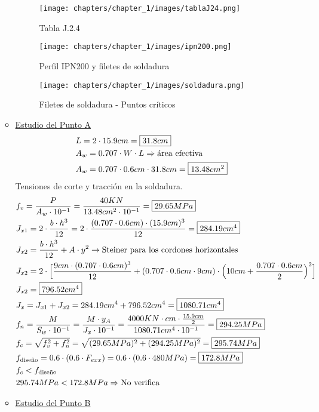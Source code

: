 \begin{enumerate}
\begin{itemize}
\begin{figure}[H]
\begin{center}
     \texttt{[image: chapters/chapter\_1/images/tablaJ24.png]}
\end{center}
\caption{Tabla J.2.4}
\end{figure}
\begin{figure}[H]
\begin{center}
     \texttt{[image: chapters/chapter\_1/images/ipn200.png]}
\end{center}
\caption{Perfil IPN200 y filetes de soldadura}
\end{figure}
\begin{figure}[H]
\begin{center}
     \texttt{[image: chapters/chapter\_1/images/soldadura.png]}
\end{center}
\caption{Filetes de soldadura - Puntos críticos}
\end{figure}

\item \underline{Estudio del Punto A}
\begin{align*}
& L = 2 \cdot 15.9cm = \framebox{$31.8cm$} \\
& A_w = 0.707 \cdot W \cdot L \Rightarrow \text{área efectiva} \\
& A_w = 0.707 \cdot 0.6 cm \cdot 31.8cm = \framebox{$13.48 cm^2$} \\
\end{align*}
Tensiones de corte y tracción en la soldadura.\\
\begin{align*}
& f_v = \frac{P}{A_w \cdot 10^{-1}} = \frac{40KN}{13.48cm^2 \cdot 10^{-1}} = \framebox{$29.65MPa$} \\
& J_{x1} = 2 \cdot \frac{b \cdot h^3}{12} = 2 \cdot \frac{(0.707 \cdot 0.6cm) \cdot (15.9cm)^3}{12} = \framebox{$284.19cm^4$} \\
& J_{x2} = \frac{b \cdot h^3}{12} + A \cdot y^2 \rightarrow \text{Steiner para los cordones horizontales} \\
& J_{x2} = 2 \cdot \Big[\frac{9cm \cdot (0.707 \cdot 0.6cm)^3}{12} + (0.707 \cdot 0.6cm \cdot 9cm) \cdot \Big(10cm+ \frac{0.707 \cdot 0.6cm}{2}\Big)^2\Big] \\
& J_{x2} = \framebox{$796.52cm^4$} \\
& J_x = J_{x1} + J_{x2} = 284.19cm^4 + 796.52cm^4 = \framebox{$1080.71cm^4$} \\
& f_n = \frac{M}{S_w \cdot 10^{-1}} = \frac{M \cdot y_A}{J_x \cdot 10^{-1}} = \frac{4000 KN \cdot cm \cdot \frac{15.9cm}{2}}{1080.71cm^4 \cdot 10^{-1}} = \framebox{$294.25MPa$} \\
& f_c = \sqrt{f_v^2 + f_n^2} = \sqrt{(29.65MPa)^2 + (294.25MPa)^2} = \framebox{$295.74MPa$} \\
& f_{\text{diseño}} = 0.6 \cdot (0.6 \cdot F_{exx}) = 0.6 \cdot (0.6 \cdot 480MPa) = \framebox{$172.8MPa$} \\
& f_c < f_{\text{diseño}} \\
& 295.74MPa < 172.8MPa \Rightarrow \text{No verifica}
\end{align*}
\newpage
\item \underline{Estudio del Punto B}


\end{itemize}
\end{enumerate}
